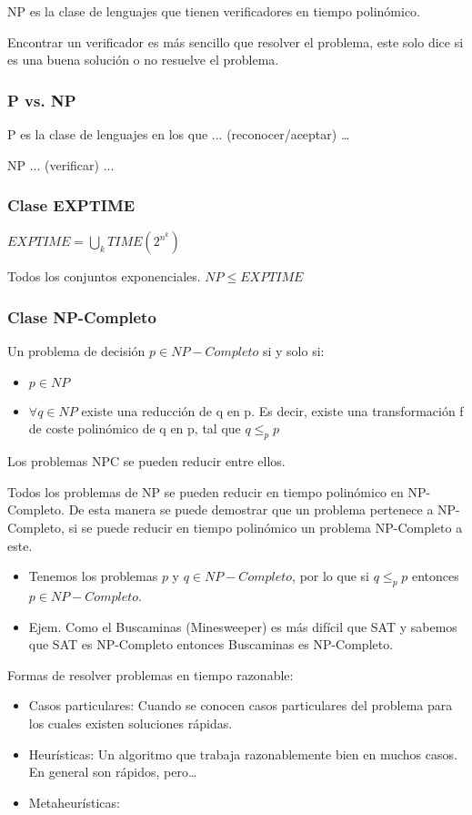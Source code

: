 NP es la clase de lenguajes que tienen verificadores en tiempo polinómico.

Encontrar un verificador es más sencillo que resolver el problema, este solo dice si es una buena solución o no resuelve el problema.

\subsubsection{P vs. NP}
P es la clase de lenguajes en los que ... (reconocer/aceptar) \dots

NP ... (verificar) ...

\subsubsection{Clase EXPTIME}
$EXPTIME= \bigcup_k TIME(2^{n^k})$

Todos los conjuntos exponenciales. $NP \leq EXPTIME$

\subsubsection{Clase NP-Completo}
Un problema de decisión $p\in NP-Completo$ si y solo si:
\begin{itemize}
  \item $p \in NP$
  \item $\forall q \in NP$ existe una reducción de q en p. Es decir, existe una transformación f de coste polinómico de q en p, tal que $q \leq_p p$
\end{itemize}

Los problemas NPC se pueden reducir entre ellos.

Todos los problemas de NP se pueden reducir en tiempo polinómico en NP-Completo. De esta manera se puede demostrar que un problema pertenece a NP-Completo, si se puede reducir en tiempo polinómico un problema NP-Completo a este.
\begin{itemize}
  \item Tenemos los problemas $p$ y $ q\in NP-Completo$, por lo que si $q \leq_p p$ entonces $p \in NP-Completo$.
  \item Ejem. Como el Buscaminas (Minesweeper) es más difícil que SAT y sabemos que SAT es NP-Completo entonces Buscaminas es NP-Completo.
\end{itemize}

Formas de resolver problemas en tiempo razonable:
\begin{itemize}
  \item Casos particulares: Cuando se conocen casos particulares del problema para los cuales existen soluciones rápidas.
  \item Heurísticas: Un algoritmo que trabaja razonablemente bien en muchos casos. En general son rápidos, pero\dots
  \item Metaheurísticas:
\end{itemize}

